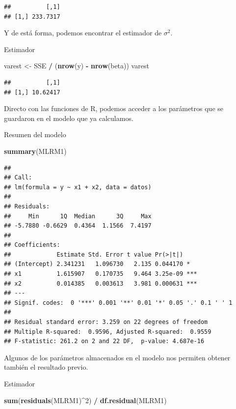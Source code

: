 \documentclass[
]{book}
\newenvironment{Shaded}{\begin{snugshade}}{\end{snugshade}}
\newcommand{\DecValTok}[1]{\textcolor[rgb]{0.00,0.00,0.81}{#1}}
\newcommand{\FunctionTok}[1]{\textcolor[rgb]{0.13,0.29,0.53}{\textbf{#1}}}
\newcommand{\NormalTok}[1]{#1}
\newcommand{\OtherTok}[1]{\textcolor[rgb]{0.56,0.35,0.01}{#1}}
\newcommand{\SpecialCharTok}[1]{\textcolor[rgb]{0.81,0.36,0.00}{\textbf{#1}}}
\begin{document}
\begin{verbatim}
##          [,1]
## [1,] 233.7317
\end{verbatim}

Y de está forma, podemos encontrar el estimador de \(\sigma^2\).

Estimador

\begin{Shaded}
\begin{Highlighting}[]
\NormalTok{varest }\OtherTok{\textless{}{-}}\NormalTok{ SSE }\SpecialCharTok{/}\NormalTok{ (}\FunctionTok{nrow}\NormalTok{(y) }\SpecialCharTok{{-}} \FunctionTok{nrow}\NormalTok{(beta))}
\NormalTok{varest}
\end{Highlighting}
\end{Shaded}

\begin{verbatim}
##          [,1]
## [1,] 10.62417
\end{verbatim}

Directo con las funciones de R, podemos acceder a los parámetros que se guardaron en el modelo que ya calculamos.

Resumen del modelo

\begin{Shaded}
\begin{Highlighting}[]
\FunctionTok{summary}\NormalTok{(MLRM1)}
\end{Highlighting}
\end{Shaded}

\begin{verbatim}
## 
## Call:
## lm(formula = y ~ x1 + x2, data = datos)
## 
## Residuals:
##     Min      1Q  Median      3Q     Max 
## -5.7880 -0.6629  0.4364  1.1566  7.4197 
## 
## Coefficients:
##             Estimate Std. Error t value Pr(>|t|)    
## (Intercept) 2.341231   1.096730   2.135 0.044170 *  
## x1          1.615907   0.170735   9.464 3.25e-09 ***
## x2          0.014385   0.003613   3.981 0.000631 ***
## ---
## Signif. codes:  0 '***' 0.001 '**' 0.01 '*' 0.05 '.' 0.1 ' ' 1
## 
## Residual standard error: 3.259 on 22 degrees of freedom
## Multiple R-squared:  0.9596, Adjusted R-squared:  0.9559 
## F-statistic: 261.2 on 2 and 22 DF,  p-value: 4.687e-16
\end{verbatim}

Algunos de los parámetros almacenados en el modelo nos permiten obtener también el resultado previo.

Estimador

\begin{Shaded}
\begin{Highlighting}[]
\FunctionTok{sum}\NormalTok{(}\FunctionTok{residuals}\NormalTok{(MLRM1)}\SpecialCharTok{\^{}}\DecValTok{2}\NormalTok{) }\SpecialCharTok{/} \FunctionTok{df.residual}\NormalTok{(MLRM1)}
\end{Highlighting}
\end{Shaded}
\end{document}
